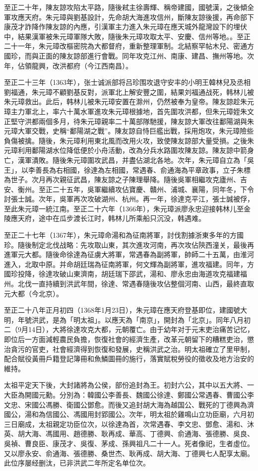 至正二十年，陳友諒攻陷太平路，隨後弒主徐壽輝、稱帝建國，國號漢，之後傾全軍攻應天府。朱元璋與劉基設計，先命胡大海進攻信州，斷陳友諒後援，再命部下康茂才詐降作陳友諒的內應，引漢軍主力進入朱元璋在應天城外龍灣設下的埋伏中，結果漢軍被朱元璋軍隊大敗，隨後朱元璋攻取太平、安慶、信州等地。。至正二十一年，朱元璋改樞密院為大都督府，重新整理軍制。北結察罕帖木兒、密通方國珍，而與正面的陳友諒部進行會戰。同年攻克江州、南康、建昌、撫州等地。次年，佔領龍興，改洪都府（今江西南昌）。

至正二十三年（1363年），张士诚派部将吕珍围攻退守安丰的小明王韓林兒及丞相劉福通，朱元璋不顧劉基反對，派軍北上解安豐之圍，結果刘福通战死，韩林儿被朱元璋救出。此后，韩林儿被朱元璋安置在滁州，仍然被奉为皇帝。陳友諒趁朱元璋主力軍北上，率六十萬水軍進攻朱元璋根據地，首先圍攻洪都，但朱元璋姪朱文正堅守洪都兩個多月，待朱元璋親率二十萬部隊馳援，陳友諒大軍改往鄱陽湖與朱元璋大軍交戰，史稱“鄱陽湖之戰”。陳友諒自恃巨艦出戰，採用炮攻，朱元璋險些負傷被擒。隨後，朱元璋利用東北風而改用火攻，致使陳友諒部大量受損。之後朱元璋利用鄱陽湖水位降低便於小舟活動，改為分兵水路圍攻陳友諒。陳友諒中箭身亡，漢軍潰敗。隨後朱元璋圍攻武昌，并盡佔湖北各地。次年，朱元璋自立為「吳王」，以李善長為右相國，徐達為左相國，常遇春、俞通海為平章政事，立子朱標為世子。次月再次親征武昌，陳友諒之子陳理舉降。隨後吳軍相繼攻克廬州、吉安、衡州。至正二十五年，吳軍繼續攻佔寶慶、贛州、浦城、襄陽，同年冬，下令討張士誠。次年，吳軍再次攻破湖州、杭州。再一年，徐達克平江，張士誠被俘，至此朱元璋一統江南。至正二十六年（1366年），朱元璋派廖永忠迎接韩林儿至金陵應天府，途中在瓜步渡长江时，韩林儿所乘船只沉没，韩遇难。

至正二十七年（1367年），朱元璋命湯和為征南將軍，討伐割據浙東多年的方國珍。隨後制定北伐战略：先攻取山東，其次進攻河南，再次攻佔陝西潼关，最後再進軍元大都。隨後命徐達為征虜大將軍，常遇春為副將軍，帥師二十五萬，由淮河進入，北取中原。并命胡廷瑞為征南將軍，何文輝為副將軍，進攻福建。同年，方國珍投降，徐達攻破山東濟南，胡廷瑞下邵武，湯和、廖永忠由海道攻克福建福州。北伐一直持續到洪武年間，徐達、常遇春隨後攻佔整個河南、山西，最終直取元大都（今北京）。

至正二十八年正月初四（1368年1月23日），朱元璋在應天府登基即位，建國號大明，年號洪武，是為「明太祖」。以應天為「南京」，開封為「北京」。同年八月初二（9月14日），大將徐達攻克大都，元朝覆亡。由于幼年对于元末吏治痛苦记忆，即位后一方面減輕農民負擔，恢復社會的經濟生產，改革元朝留下的糟糕吏治，懲治貪污的官吏，社會經濟得到恢復和發展，史稱洪武之治。明太祖確立了里甲制，配合賦役黃冊戶籍登記簿冊和魚鱗圖冊的施行，落實賦稅勞役的徵收及地方治安的維持。

太祖平定天下後，大封諸將為公侯，部份追封為王。初封六公，其中以五大將、一大臣為開國元勳。分別為：韓國公李善長、魏國公徐達、鄭國公常遇春、曹國公李文忠、宋國公馮勝、衛國公鄧愈。而後又追封胡大海為越国公、戰死的丁德興為濟國公，湯和為信國公、馮國用封郢國公。次年，明太祖於雞鳴山立功臣廟，六月初三日廟成，太祖親定功臣位次，以徐達為首，次常遇春、李文忠、鄧愈、湯和、沐英、胡大海、馮國用、趙德勝、耿再成、華高、丁德興、俞通海、張德勝、吳良、吳禎、曹良臣、康茂才、吳復、茅成、孫興祖凡二十一人。死者像祀，生者虛位。又以廖永安、俞通海、張德勝、桑世杰、耿再成、胡大海、丁德興七人配享太廟。此位序屡经删汰，已非洪武二年所定名单位次。

